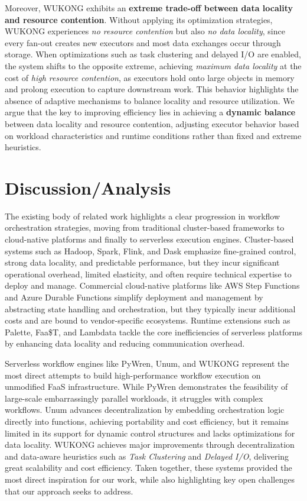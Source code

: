 \begin{itemize}
Moreover, WUKONG exhibits an \textbf{extreme trade-off between data locality and resource contention}. Without applying its optimization strategies, WUKONG experiences \textit{no resource contention} but also \textit{no data locality}, since every fan-out creates new executors and most data exchanges occur through storage. When optimizations such as task clustering and delayed I/O are enabled, the system shifts to the opposite extreme, achieving \textit{maximum data locality} at the cost of \textit{high resource contention}, as executors hold onto large objects in memory and prolong execution to capture downstream work. This behavior highlights the absence of adaptive mechanisms to balance locality and resource utilization. We argue that the key to improving efficiency lies in achieving a \textbf{dynamic balance} between data locality and resource contention, adjusting executor behavior based on workload characteristics and runtime conditions rather than fixed and extreme heuristics.

\end{itemize}

\section{Discussion/Analysis}
The existing body of related work highlights a clear progression in workflow orchestration strategies, moving from traditional cluster-based frameworks to cloud-native platforms and finally to serverless execution engines. Cluster-based systems such as Hadoop, Spark, Flink, and Dask emphasize fine-grained control, strong data locality, and predictable performance, but they incur significant operational overhead, limited elasticity, and often require technical expertise to deploy and manage. Commercial cloud-native platforms like AWS Step Functions and Azure Durable Functions simplify deployment and management by abstracting state handling and orchestration, but they typically incur additional costs and are bound to vendor-specific ecosystems. Runtime extensions such as Palette, Faa\$T, and Lambdata tackle the core inefficiencies of serverless platforms by enhancing data locality and reducing communication overhead.

Serverless workflow engines like PyWren, Unum, and WUKONG represent the most direct attempts to build high-performance workflow execution on unmodified FaaS infrastructure. While PyWren demonstrates the feasibility of large-scale embarrassingly parallel workloads, it struggles with complex workflows. Unum advances decentralization by embedding orchestration logic directly into functions, achieving portability and cost efficiency, but it remains limited in its support for dynamic control structures and lacks optimizations for data locality. WUKONG achieves major improvements through decentralization and data-aware heuristics such as \textit{Task Clustering} and \textit{Delayed I/O}, delivering great scalability and cost efficiency. Taken together, these systems provided the most direct inspiration for our work, while also highlighting key open challenges that our approach seeks to address.
